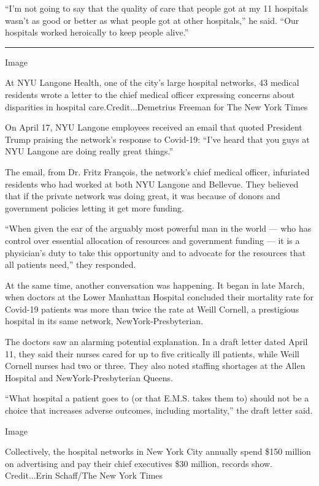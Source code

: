 ``I'm not going to say that the quality of care that people got at my 11
hospitals wasn't as good or better as what people got at other
hospitals,'' he said. ``Our hospitals worked heroically to keep people
alive.''

\begin{center}\rule{0.5\linewidth}{\linethickness}\end{center}

Image

At NYU Langone Health, one of the city's large hospital networks, 43
medical residents wrote a letter to the chief medical officer expressing
concerns about disparities in hospital care.Credit...Demetrius Freeman
for The New York Times

On April 17, NYU Langone employees received an email that quoted
President Trump praising the network's response to Covid-19: ``I've
heard that you guys at NYU Langone are doing really great things.''

The email, from Dr. Fritz François, the network's chief medical officer,
infuriated residents who had worked at both NYU Langone and Bellevue.
They believed that if the private network was doing great, it was
because of donors and government policies letting it get more funding.

``When given the ear of the arguably most powerful man in the world ---
who has control over essential allocation of resources and government
funding --- it is a physician's duty to take this opportunity and to
advocate for the resources that all patients need,'' they responded.

At the same time, another conversation was happening. It began in late
March, when doctors at the Lower Manhattan Hospital concluded their
mortality rate for Covid-19 patients was more than twice the rate at
Weill Cornell, a prestigious hospital in its same network,
NewYork-Presbyterian.

The doctors saw an alarming potential explanation. In a draft letter
dated April 11, they said their nurses cared for up to five critically
ill patients, while Weill Cornell nurses had two or three. They also
noted staffing shortages at the Allen Hospital and NewYork-Presbyterian
Queens.

``What hospital a patient goes to (or that E.M.S. takes them to) should
not be a choice that increases adverse outcomes, including mortality,''
the draft letter said.

Image

Collectively, the hospital networks in New York City annually spend
\$150 million on advertising and pay their chief executives \$30
million, records show. Credit...Erin Schaff/The New York Times

